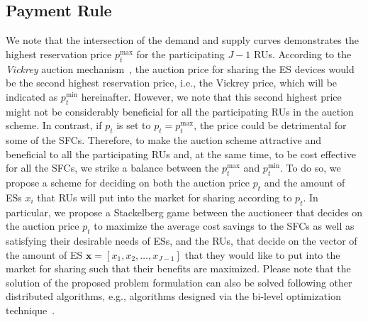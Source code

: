 \documentclass[journal,10pt]{IEEEtran}
\begin{document}
\subsection{Payment Rule}\label{sec:payment} We note that the intersection of the demand and supply curves demonstrates the highest reservation price $p_t^\text{max}$ for the participating $J-1$ RUs. According to the \emph{Vickrey} auction mechanism~\cite{Vickrey-JF:1961}, the auction price for sharing the ES devices would be the second highest reservation price, i.e., the Vickrey price, which will be indicated as $p_t^\text{min}$ hereinafter. However, we note that this second highest price might not be considerably beneficial for all the participating RUs in the auction scheme. In contrast, if $p_t$ is set to $p_t = p_t^\text{max}$, the price could be detrimental for some of the SFCs. Therefore, to make the auction scheme attractive and beneficial to all the participating RUs and, at the same time, to be cost effective for all the SFCs, we strike a balance between the $p_t^\text{max}$ and $p_t^\text{min}$. To do so, we propose a scheme for deciding on both the auction price $p_t$ and the amount of ESs $x_i$ that RUs will put into the market for sharing according to $p_t$. In particular, we propose a Stackelberg game between the auctioneer that decides on the auction price $p_t$ to maximize the average cost savings to the SFCs as well as satisfying their desirable needs of ESs, and the RUs, that decide on the vector of the amount of ES $\mathbf{x} = [x_1, x_2,\hdots, x_{J-1}]$ that they would like to put into the market for sharing such that their benefits are maximized. Please note that the solution of the proposed problem formulation can also be solved following other distributed algorithms, e.g., algorithms designed via the bi-level optimization technique~\cite{Oduguwa:2002}.
\end{document}

